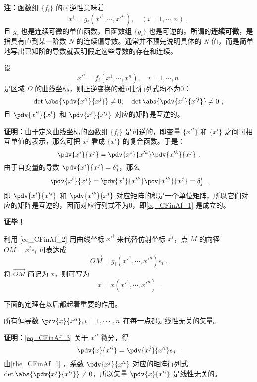 \textbf{注：}函数组 $\{f_i\}$ 的可逆性意味着
\begin{equation}\label{eq_CFinAf_2}
x^i=g_i(x'^1,\cdots,x'^n),\quad (i=1,\cdots,n)~,
\end{equation}
且 $g_i$ 也是连续可微的单值函数，且函数组 $\{g_i\}$ 也是可逆的。所谓的\textbf{连续可微}，是指具有直到某一阶数 $N$ 的连续偏导数。通常并不预先说明具体的 $N$ 值，而是简单地写出已知阶的导数就表明假定这些导数的存在和连续。
\begin{theorem}{}\label{the_CFinAf_1}
设
\begin{equation}
x'^i=f_i(x^1,\cdots,x^n),\quad i=1,\cdots,n~
\end{equation}
是区域 $\Omega$ 的曲线坐标，则正逆变换的雅可比行列式均不为0：
\begin{equation}\label{eq_CFinAf_1}
\det\abs{\pdv{x'^i}{x^j}}\neq0;\quad\det\abs{\pdv{x^i}{x'^j}}\neq0~,
\end{equation}
且 $\pdv{x'^i}{x^j}$ 和 $\pdv{x^i}{x'^j}$ 对应的矩阵是互逆的。
\end{theorem}
\textbf{证明：}由于定义曲线坐标的函数组 $\{f_i\}$ 是可逆的，即变量 $\{x'^i\}$ 和 $\{x^i\}$ 之间可相互单值的表示，那么可把 $x^j$ 看成 $\{x^i\}$ 的复合函数。于是：
\begin{equation}
\pdv{x^i}{x^j}=\pdv{x^i}{x'^k}\pdv{x'^k}{x^j}~.
\end{equation}
由于自变量的导数 $\pdv{x^i}{x^j}=\delta^i_j$，那么
\begin{equation}
\pdv{x^i}{x^j}=\pdv{x^i}{x'^k}\pdv{x'^k}{x^j}=\delta^i_j~.
\end{equation}
即 $\pdv{x^i}{x'^k}$ 和 $\pdv{x'^k}{x^j}$ 对应矩阵的积是一个单位矩阵，所以它们对应的矩阵是互逆的，因而对应行列式不为0，即\autoref{eq_CFinAf_1} 是成立的。

 
\textbf{证毕！}

利用 \autoref{eq_CFinAf_2} 用曲线坐标 $x'^i$ 来代替仿射坐标 $x^i$，点 $M$ 的向径 $\overrightarrow {OM}=x^i e_i$ 可表达成
\begin{equation}\label{eq_CFinAf_3}
\overrightarrow{OM}=g_i(x'^1,\cdots,x'^n)e_i~.
\end{equation}
将 $\overrightarrow{OM}$ 简记为 $x$，则可写为
\begin{equation}
x=x(x'^1,\cdots,x'^n)~.
\end{equation}


下面的定理在以后都起着重要的作用。
\begin{theorem}{}\label{the_CFinAf_2}
所有偏导数 $\pdv{x}{x'^i},i=1,\cdots,n$ 在每一点都是线性无关的矢量。
\end{theorem}
\textbf{证明：}\autoref{eq_CFinAf_3} 关于 $x'^i$ 微分，得
\begin{equation}
\pdv{x}{x'^i}=\pdv{x^j}{x'^i}e_j~.
\end{equation}
由\autoref{the_CFinAf_1} ，系数 $\pdv{x^j}{x'^i}$ 对应的矩阵行列式 $\det\abs{\pdv{x^j}{x'^i}}\neq0$，所以矢量 $\pdv{x}{x'^i}$ 是线性无关的。


